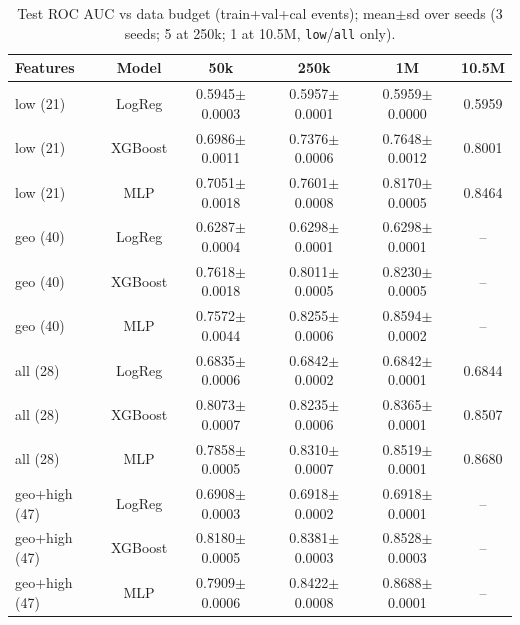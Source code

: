 \begin{table}[!t]
\centering
\caption{Test ROC AUC vs data budget (train+val+cal events); mean$\pm$sd over seeds (3 seeds; 5 at 250k; 1 at 10.5M, \texttt{low}/\texttt{all} only).}
\label{tab:scaling}
\footnotesize
\setlength{\tabcolsep}{3.5pt}
\begin{tabular}{lccccc}
\toprule
Features & Model & 50k & 250k & 1M & 10.5M \\
\midrule
low (21) & LogReg & 0.5945$\pm$0.0003 & 0.5957$\pm$0.0001 & 0.5959$\pm$0.0000 & 0.5959 \\
low (21) & XGBoost & 0.6986$\pm$0.0011 & 0.7376$\pm$0.0006 & 0.7648$\pm$0.0012 & 0.8001 \\
low (21) & MLP & 0.7051$\pm$0.0018 & 0.7601$\pm$0.0008 & 0.8170$\pm$0.0005 & 0.8464 \\
geo (40) & LogReg & 0.6287$\pm$0.0004 & 0.6298$\pm$0.0001 & 0.6298$\pm$0.0001 & -- \\
geo (40) & XGBoost & 0.7618$\pm$0.0018 & 0.8011$\pm$0.0005 & 0.8230$\pm$0.0005 & -- \\
geo (40) & MLP & 0.7572$\pm$0.0044 & 0.8255$\pm$0.0006 & 0.8594$\pm$0.0002 & -- \\
all (28) & LogReg & 0.6835$\pm$0.0006 & 0.6842$\pm$0.0002 & 0.6842$\pm$0.0001 & 0.6844 \\
all (28) & XGBoost & 0.8073$\pm$0.0007 & 0.8235$\pm$0.0006 & 0.8365$\pm$0.0001 & 0.8507 \\
all (28) & MLP & 0.7858$\pm$0.0005 & 0.8310$\pm$0.0007 & 0.8519$\pm$0.0001 & 0.8680 \\
geo+high (47) & LogReg & 0.6908$\pm$0.0003 & 0.6918$\pm$0.0002 & 0.6918$\pm$0.0001 & -- \\
geo+high (47) & XGBoost & 0.8180$\pm$0.0005 & 0.8381$\pm$0.0003 & 0.8528$\pm$0.0003 & -- \\
geo+high (47) & MLP & 0.7909$\pm$0.0006 & 0.8422$\pm$0.0008 & 0.8688$\pm$0.0001 & -- \\
\bottomrule
\end{tabular}
\end{table}
